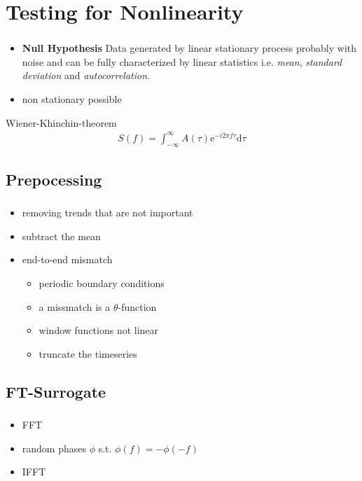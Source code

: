 \section{Testing for Nonlinearity}
\begin{frame}
  \frametitle{\insertsectionhead}
  \framesubtitle{\insertsubsectionhead}
  \begin{itemize}
    \item \textbf{Null Hypothesis} Data generated by linear stationary process probably with noise and can be fully characterized by linear statistics i.e. \textit{mean}, \textit{standard deviation} and \textit{autocorrelation}. \cite{LANCASTER20181}
    \item non stationary possible
  \end{itemize}
  Wiener-Khinchin-theorem
  \begin{gather*}
    S(f) = \int_{-\infty}^{\infty}A(\tau) \mathrm{e}^{-i 2\pi f \tau}\mathrm{d}\tau
  \end{gather*}
\end{frame}

\subsection{Prepocessing}
\begin{frame}
  \frametitle{\insertsectionhead}
  \framesubtitle{\insertsubsectionhead}
  \begin{itemize}
    \item removing trends that are not important
    \item subtract the mean
    \item end-to-end mismatch
    \begin{itemize}
      \item periodic boundary conditions
      \item a missmatch is a $\theta$-function 
      \item window functions not linear 
      \item truncate the timeseries
    \end{itemize}
  \end{itemize}
\end{frame}

\subsection{FT-Surrogate}
\begin{frame}
  \frametitle{\insertsectionhead}
  \framesubtitle{\insertsubsectionhead}
  \begin{itemize}
    \item FFT
    \item random phases $\phi$ s.t. $\phi(f)=-\phi(-f)$ 
    \item IFFT
  \end{itemize}
\end{frame}

